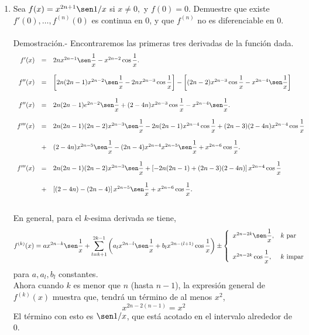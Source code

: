 \begin{enumerate}[\bfseries 1.]
     \item Sea $f(x)=x^{2n+1}\sen 1/x$ si $x\neq 0,$ y $f(0)=0$. Demuestre que existe $f'(0),\ldots , f^{(n)}(0)$ es continua en $0$, y que $f^{(n)}$ no es diferenciable en $0$.\\\\
	 Demostración.-\; Encontraremos las primeras tres derivadas de la función dada.
	 $$\begin{array}{rcl}
	     f'(x)&=&2nx^{2n-1}\sen\dfrac{1}{x}-x^{2n-2}\cos\dfrac{1}{x}.\\\\
	     f''(x)&=&\left[2n(2n-1)x^{2n-2}\sen \dfrac{1}{x}-2nx^{2n-3}\cos \dfrac{1}{x}\right]-\left[(2n-2)x^{2n-3}\cos \dfrac{1}{x}-x^{2n-4}\sen\dfrac{1}{x}\right]\\\\
	     f''(x)&=&2n(2n-1)e^{2n-2}\sen \dfrac{1}{x}+(2-4n)x^{2n-3}\cos \dfrac{1}{x}-x^{2n-4}\sen \dfrac{1}{x}.\\\\
	     f'''(x) &=& 2n(2n-1)(2n-2)x^{2n-3}\sen \dfrac{1}{x}-2n(2n-1)x^{2n-4}\cos \dfrac{1}{x} + (2n-3)(2-4n)x^{2n-4}\cos \dfrac{1}{x}\\\\
		     &+&(2-4n)x^{2n-5}\sen \dfrac{1}{x}-(2n-4)x^{2n-4}x^{2n-5}\sen \dfrac{1}{x}+x^{2n-6}\cos \dfrac{1}{x}.\\\\
	     f'''(x)&=&2n(2n-1)(2n-2)x^{2n-3}\sen \dfrac{1}{x}+\left[-2n(2n-1)+(2n-3)(2-4n)\right]x^{2n-4}\cos \dfrac{1}{x}\\\\
		    &+&\left[(2-4n)-(2n-4)\right]x^{2n-5}\sen \dfrac{1}{x}+x^{2n-6}\cos \dfrac{1}{x}.\\\\
	 \end{array}$$

	 En general, para el $k$-esima derivada se tiene,
	 $$f^{(k)}(x)=ax^{2n-k}\sen \dfrac{1}{x}+\sum_{l=k+1}^{2k-1}\left(a_l x^{2n-l}\sen \dfrac{1}{x}+b_lx^{2n-(l+1)}\cos \dfrac{1}{x}\right)\pm \left\{\begin{array}{ll}
		 x^{2n-2k}\sen \dfrac{1}{x},&k\mbox{ par}\\\\
		 x^{2n-2k}\cos \dfrac{1}{x},&k\mbox{ impar}\\
	 \end{array}\right.$$
	 para $a,a_l,b_l$ constantes.\\

	 Ahora cuando $k$ es menor que $n$ (hasta $n-1$), la expresión general de $f^{(k)}(x)$ muestra que, tendrá un término de al menos $x^2$,
	 $$x^{2n-2(n-1)}=x^2$$
	 El término con esto es $\sen 1/x$, que está acotado en el intervalo alrededor de $0$.\\


\end{enumerate}
